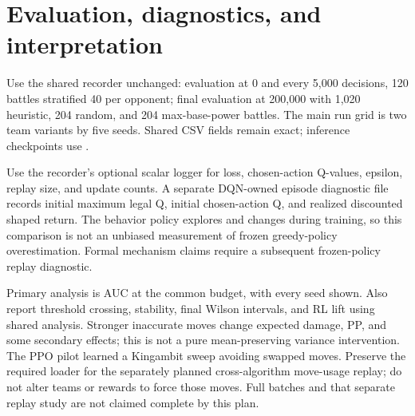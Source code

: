 \documentclass[11pt,a4paper]{article}
\newcommand{\code}[1]{\texttt{\detokenize{#1}}}
\begin{document}
\section{Evaluation, diagnostics, and interpretation}
Use the shared recorder unchanged: evaluation at 0 and every 5,000 decisions, 120 battles stratified 40 per opponent; final evaluation at 200,000 with 1,020 heuristic, 204 random, and 204 max-base-power battles. The main run grid is two team variants by five seeds. Shared CSV fields remain exact; inference checkpoints use \code{ckpt/step_<step>.pt}.

Use the recorder's optional scalar logger for loss, chosen-action Q-values, epsilon, replay size, and update counts. A separate DQN-owned episode diagnostic file records initial maximum legal Q, initial chosen-action Q, and realized discounted shaped return. The behavior policy explores and changes during training, so this comparison is not an unbiased measurement of frozen greedy-policy overestimation. Formal mechanism claims require a subsequent frozen-policy replay diagnostic.

Primary analysis is AUC at the common budget, with every seed shown. Also report threshold crossing, stability, final Wilson intervals, and RL lift using shared analysis. Stronger inaccurate moves change expected damage, PP, and some secondary effects; this is not a pure mean-preserving variance intervention. The PPO pilot learned a Kingambit sweep avoiding swapped moves. Preserve the required loader for the separately planned cross-algorithm move-usage replay; do not alter teams or rewards to force those moves. Full batches and that separate replay study are not claimed complete by this plan.
\end{document}
